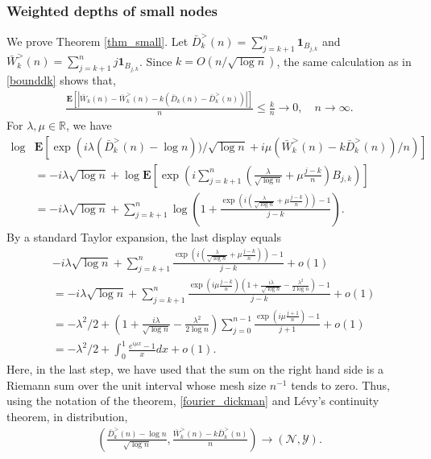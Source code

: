 \documentclass{amsart}       %
\newcommand{\sN}{\mathcal N}
\newcommand{\sY}{\mathcal Y}
\newcommand{\R}{\ensuremath{\mathbb{R}}}
\newcommand{\E}[1]{\ensuremath{\mathbf{E} \left[#1 \right]}}
\newcommand{\I}[1]{\ensuremath{\mathbf{1}_{  #1  }}}
\begin{document}
\subsubsection{Weighted depths of small nodes}
We prove Theorem \ref{thm_small}. Let $\bar D^>_k(n) = \sum_{j = k+1}^n \I{B_{j,k}}$ and $\bar W^>_k(n) = \sum_{j = k+1}^n j \I{B_{j,k}}$. Since $k = O(n/ \sqrt{\log n})$, the same calculation as in \eqref{bounddk} shows that,   \begin{align} \label{de1} \frac{\E{| \bar W_k(n) - \bar W^>_k(n) - k (\bar D_k(n) - \bar D^>_k(n) )|}}{n} \leq \frac k n \to 0, \quad n \to \infty. \end{align}
For $\lambda, \mu  \in \R$, we have
\begin{align*}
\log & \E{\exp \left(i \lambda (\bar D^>_k(n) - \log n))/ \sqrt{\log n} + i \mu (\bar W^>_k(n) - k \bar D^>_k(n))/n  \right)} \\
& = - i\lambda \sqrt{\log n} + \log \E{\exp \left(i \sum_{j = k+1}^n \left(\frac{\lambda}{\sqrt{\log n}} + \mu \frac{j -k}{n}\right) B_{j,k} \right)}  \\
& = - i\lambda \sqrt{\log n} + \sum_{j=k+1}^n \log \left(1 + \frac{ \exp \left(i \left(\frac{\lambda}{\sqrt{\log n}} +  \mu \frac{j -k}{n} \right)\right)-1}{j-k}  \right).
\end{align*}
By a standard Taylor expansion, the last display equals
\begin{align*}
& -i  \lambda \sqrt{\log n} + \sum_{j=k+1}^n   \frac{ \exp \left(i \left(\frac{\lambda}{\sqrt{\log n}} +  \mu \frac{j -k}{n} \right)\right)-1}{j-k}   + o(1) \\
& = - i\lambda \sqrt{\log n}  + \sum_{j=k+1}^n   \frac{ \exp  \left( i \mu \frac{j -k}{n} \right)\left(1 + \frac{i \lambda}{\sqrt{\log n}} - \frac{\lambda^2}{2\log n}  \right)-1}{j-k}   + o(1) \\
& = - \lambda^2 /2  + \left(1 + \frac{i \lambda}{\sqrt{\log n}} - \frac{\lambda^2}{2 \log n}  \right) \sum_{j=0}^{n-1}  \frac{ \exp  \left( i \mu \frac{j+1}{n} \right)-1}{j+1}   + o(1) \\
& = - \lambda^2/2 +  \int_0^1 \frac{e^{i \mu x}-1}{x} dx + o(1).
\end{align*}
Here, in the last step, we have used that the sum on the right hand side is a Riemann sum over the unit interval whose mesh size $n^{-1}$ tends to zero.
Thus, using the notation of the theorem, \eqref{fourier_dickman} and L{\'e}vy's continuity theorem, in distribution,
\begin{align} \label{e1}\left(\frac{\bar D^>_k(n) - \log n}{\sqrt{\log n}}, \frac{\bar W^>_k(n) - k \bar D^>_k(n)}{n}\right) \to (\sN, \sY). \end{align}
\end{document}
